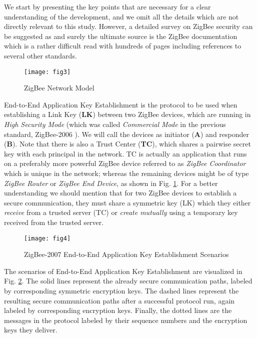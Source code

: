 We start by presenting the key points that are necessary for a clear understanding of the development, and we omit all the details which are not directly relevant to this study. However, a detailed survey on ZigBee security can be suggested as \cite{Yuksel:Nielson} and surely the ultimate source is the ZigBee documentation \cite{ZigBee:2007, ZigBee:Stack, ZigBeePRO:Stack, ZigBee:HA, ZigBee:SE} which is a rather difficult read with hundreds of pages including references to several other standards.

\begin{figure}[!htp]
\centering
\texttt{[image: fig3]}
\caption{ZigBee Network Model}
\label{fig:znet}
\end{figure}
End-to-End Application Key Establishment is the protocol to be used when establishing a Link Key (\textbf{LK}) between two ZigBee devices, 
which are running in \emph{High Security Mode} (which was called \emph{Commercial Mode} in the previous standard, ZigBee-2006 \cite{ZigBee:2006}). 
We will call the devices as initiator (\textbf{A}) and responder (\textbf{B}). 
Note that there is also a Trust Center (\textbf{TC}), which shares a pairwise secret key with each principal in the network. 
TC is actually an application that runs on a preferably more powerful ZigBee device referred to as \emph{ZigBee Coordinator} which is unique in the network; 
whereas the remaining devices might be of type \emph{ZigBee Router} or \emph{ZigBee End Device}, as shown in Fig. \ref{fig:znet}.
For a better understanding we should mention that for two ZigBee devices to establish a secure communication, 
they must share a symmetric key (LK) which they either \emph{receive} from a trusted server (TC) 
or \emph{create mutually} using a temporary key received from the trusted server.

\begin{figure}[!htp]
\centering
\texttt{[image: fig4]}
\caption{ZigBee-2007 End-to-End Application Key Establishment Scenarios}
\label{fig:scena}
\end{figure}
The scenarios of End-to-End Application Key Establishment are visualized in Fig. \ref{fig:scena}. 
The solid lines represent the already secure communication paths, labeled by corresponding symmetric encryption keys.
The dashed lines represent the resulting secure communication paths after a successful protocol run, again labeled by corresponding encryption keys.
Finally, the dotted lines are the messages in the protocol labeled by their sequence numbers and the encryption keys they deliver.

